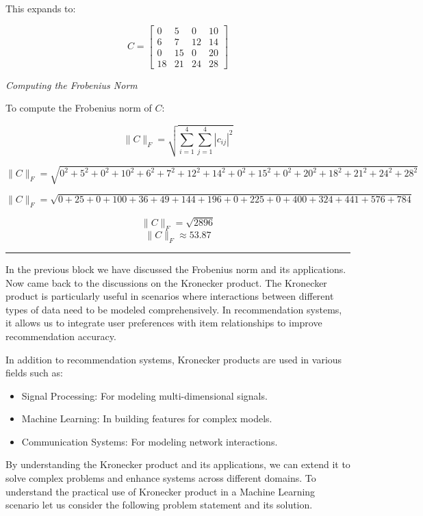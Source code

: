 \documentclass[
  letterpaper,
  DIV=11,
  numbers=noendperiod]{scrreprt}
\providecommand{\tightlist}{%
  \setlength{\itemsep}{0pt}\setlength{\parskip}{0pt}}\usepackage{longtable,booktabs,array}
\theoremstyle{plain}
\theoremstyle{definition}
\theoremstyle{remark}
\begin{document}
\begin{tcolorbox}
This expands to:

\[C = \begin{bmatrix}
0 & 5 & 0 & 10 \\
6 & 7 & 12 & 14 \\
0 & 15 & 0 & 20 \\
18 & 21 & 24 & 28
\end{bmatrix}\]

\emph{Computing the Frobenius Norm}

To compute the Frobenius norm of \(C\):

\[\|C\|_F = \sqrt{\sum_{i=1}^{4} \sum_{j=1}^{4} |c_{ij}|^2}\]

\[\|C\|_F = \sqrt{0^2 + 5^2 + 0^2 + 10^2 + 6^2 + 7^2 + 12^2 + 14^2 + 0^2 + 15^2 + 0^2 + 20^2 + 18^2 + 21^2 + 24^2 + 28^2}\]

\[\|C\|_F = \sqrt{0 + 25 + 0 + 100 + 36 + 49 + 144 + 196 + 0 + 225 + 0 + 400 + 324 + 441 + 576 + 784}\]

\[\|C\|_F = \sqrt{2896}\] \[\|C\|_F \approx 53.87\]

\begin{center}\rule{0.5\linewidth}{0.5pt}\end{center}

In the previous block we have discussed the Frobenius norm and its
applications. Now came back to the discussions on the Kronecker product.
The Kronecker product is particularly useful in scenarios where
interactions between different types of data need to be modeled
comprehensively. In recommendation systems, it allows us to integrate
user preferences with item relationships to improve recommendation
accuracy.

In addition to recommendation systems, Kronecker products are used in
various fields such as:

\begin{itemize}
\tightlist
\item
  Signal Processing: For modeling multi-dimensional signals.
\item
  Machine Learning: In building features for complex models.
\item
  Communication Systems: For modeling network interactions.
\end{itemize}

By understanding the Kronecker product and its applications, we can
extend it to solve complex problems and enhance systems across different
domains. To understand the practical use of Kronecker product in a
Machine Learning scenario let us consider the following problem
statement and its solution.


\end{tcolorbox}
\end{document}
